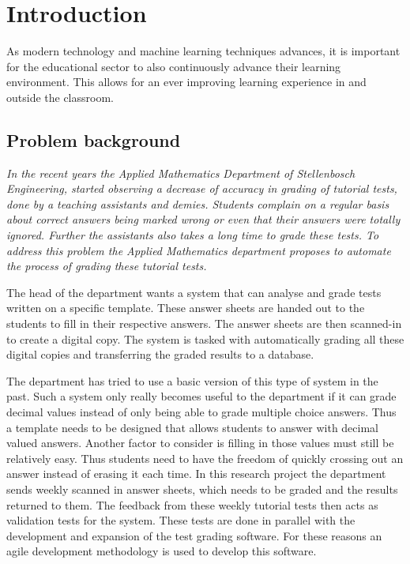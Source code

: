 \chapter{Introduction}
\label{ch:Introduction}
\graphicspath{{Chapter1/Chapter1Figures/}}
As modern technology and machine learning techniques advances, it is important for the educational sector to also continuously advance their learning environment. This allows for an ever improving learning experience in and outside the classroom. 

\section{Problem background}

\textsl{In the recent years the Applied Mathematics Department of Stellenbosch Engineering, started observing a decrease of accuracy in grading of tutorial tests, done by a teaching assistants and demies.  Students complain on a regular basis about correct answers being marked wrong or even that their answers were totally ignored. Further the assistants also takes a long time to grade these tests. To address this problem the Applied Mathematics department proposes to automate the process of grading these tutorial tests.}

The head of the department wants a system that can analyse and grade tests written on a specific template. These answer sheets are handed out to the students to fill in their respective answers. The answer sheets are then scanned-in to create a digital copy. The system is tasked with automatically grading all these digital copies and transferring the graded results to a database.

The department has tried to use a basic version of this type of system in the past. Such a system only really becomes useful to the department if it can grade decimal values instead of only being able to grade multiple choice answers. Thus a template needs to be designed that allows students to answer with decimal valued answers. Another factor to consider is filling in those values must still be relatively easy. Thus students need to have the freedom of quickly crossing out an answer instead of erasing it each time.
In this research project the department sends weekly scanned in answer sheets, which needs to be graded and the results returned to them. The feedback from these weekly tutorial tests then acts as validation tests for the system. These tests are done in parallel with the development and expansion of the test grading software. For these reasons an agile development methodology is used to develop this software.

